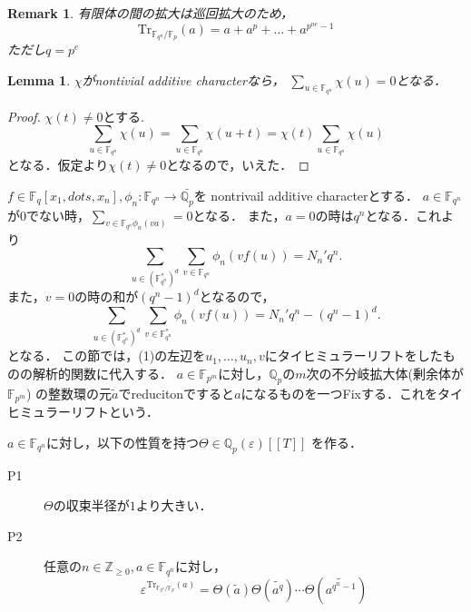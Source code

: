 \documentclass{ujarticle}
\newtheorem{lem}[thm]{Lemma}
\newtheorem*{rem}{Remark}
\begin{document}
\begin{rem}
 有限体の間の拡大は巡回拡大のため，
 \begin{equation*}
   \mathrm{Tr}_{\mathbb{F}_{q^n}/\mathbb{F}_p}(a)=
   a + a^p + \dots + a^{p^{ne}-1}
 \end{equation*}
 ただし$q=p^e$
\end{rem}

\begin{lem}
 $\chi$がnontivial additive characterなら， $\sum_{u \in
 \mathbb{F}_{q^n}}\chi(u)=0$となる．
\end{lem}

\begin{proof}
 $\chi(t) \neq 0$とする.
 \begin{equation*}
   \sum_{u \in \mathbb{F}_{q^n}}\chi(u)=
   \sum_{u \in \mathbb{F}_{q^n}}\chi(u+t)=
   \chi(t)\sum_{u \in \mathbb{F}_{q^n}}\chi(u)
 \end{equation*}
 となる．仮定より$\chi(t) \neq 0$となるので，いえた．
\end{proof}

$f \in \mathbb{F}_q[x_1,dots,x_n], \phi_n: \mathbb{F}_{q^n} \to \bar{\mathbb{Q}_p}$を
nontrivail additive characterとする．
$a \in \mathbb{F}_{q^n}$が0でない時，$\sum_{v \in \mathbb{F}_{q^n}\phi_n(va)}=0$となる．
また，$a=0$の時は$q^n$となる．これより
\begin{equation*}
 \sum_{u \in (\mathbb{F}_{q^n}^*)^d} \sum_{v \in \mathbb{F}_{q^n}} \phi_n(vf(u))=
 N_n'q^n.
\end{equation*}
また，$v=0$の時の和が$(q^n-1)^d$となるので，
\begin{equation}
  \sum_{u \in (\mathbb{F}_{q^n}^*)^d} \sum_{v \in \mathbb{F}_{q^n}^*} \phi_n(vf(u))=
  N_n'q^n - (q^n-1)^d.
\end{equation}
となる．
この節では，(1)の左辺を$u_1,\dots,u_n,v$にタイヒミュラーリフトをしたものの解析的関数に代入する．
$a \in \mathbb{F}_{p^m}$に対し，$\mathbb{Q}_p$の$m$次の不分岐拡大体(剰余体が$\mathbb{F}_{p^m}$)
の整数環の元$\tilde{a}$でreducitonですると$a$になるものを一つFixする．これをタイヒミュラーリフトという．

$a \in \mathbb{F}_{q^n}$に対し，以下の性質を持つ$\Theta \in \mathbb{Q}_p(\varepsilon)[[T]]$
を作る．

\begin{description}
  \item[P1] $\Theta$の収束半径が$1$より大きい．
  \item[P2] 任意の$n \in \mathbb{Z}_{\ge 0}, a \in \mathbb{F}_{q^n}$に対し，
  \begin{equation}
    \varepsilon^{\mathrm{Tr}_{\mathbb{F}_{q^n}/\mathbb{F}_p}(a)}=
    \Theta(\tilde{a})\Theta(\tilde{a^q})\cdots\Theta(\tilde{a^{q^n-1}})
  \end{equation}
\end{description}
\end{document}

